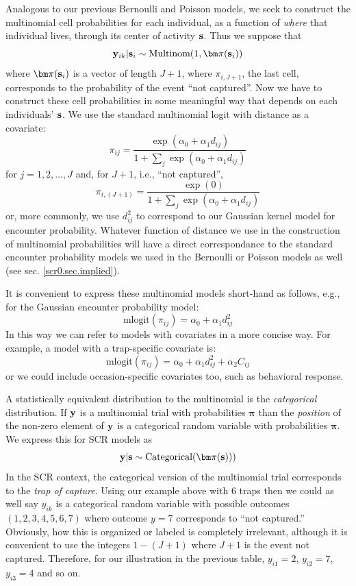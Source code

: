 Analogous to our previous Bernoulli and Poisson models, we seek to
construct the multinomial cell probabilities for each individual, as a
function of {\it where} that individual lives, through its center of
activity ${\bf s}$. Thus we suppose that
\begin{equation}
 {\bf y}_{ik}|{\bf s}_{i} \sim \mbox{Multinom}(1, {\bm \pi}({\bf s}_{i}) )
\label{poisson-mn.eq.mn}
\end{equation}
where ${\bm \pi}({\bf s}_{i})$ is a vector of length $J+1$, where
 $\pi_{i,J+1}$, the last cell, corresponds
 to the probability of the event ``not captured''.
Now we have to
construct these cell probabilities in some meaningful way that depends
on each individuals' ${\bf s}$.
We use the standard
multinomial logit with distance as a covariate:
\[
 \pi_{ij} = \frac{  \exp(\alpha_{0} + \alpha_{1} d_{ij}) }{ 1+ \sum_{j}
   \exp(\alpha_{0} + \alpha_{1} d_{ij})}
\]
for $j=1,2,\ldots,J$ and, for $J+1$, i.e., ``not captured'',
\[
 \pi_{i,(J+1)} = \frac{  \exp(0) }
                    { 1+ \sum_{j} \exp(\alpha_{0} + \alpha_{1} d_{ij})}
\]
or, more commonly, we use $d_{ij}^{2}$ to correspond to our Gaussian
kernel model for encounter probability. Whatever function of distance
we use in the construction of multinomial probabilities will have a
direct correspondance to the standard encounter probability models we
used in the Bernoulli or Poisson models as well (see
sec. \ref{scr0.sec.implied}). 

It is convenient to express these multinomial models short-hand as
follows, e.g., for the Gaussian encounter probability model:
\[
\mbox{mlogit}( \pi_{ij} ) = \alpha_{0} + \alpha_{1} d_{ij}^{2}
\]
In this way we can refer to models with covariates in a more concise
way. For example, a model with a trap-specific covariate is:
\[
\mbox{mlogit}( \pi_{ij} ) = \alpha_{0} + \alpha_{1} d_{ij}^{2} + \alpha_{2} C_{ij}
\]
or we could include occasion-specific covariates too, such as
behavioral response. 

A statistically equivalent distribution to the multinomial is the {\it categorical}
distribution.  If ${\bf y}$ is a multinomial trial with probabilities
${\bm \pi}$ than the {\it position} of the non-zero element of ${\bf
  y}$ is a categorical random variable with probabilities ${\bm \pi}$.
We express this for SCR models as
\[
{\bf y}|{\bf s} \sim \mbox{Categorical}( {\bm \pi}({\bf s})) )
\]
In the SCR context, the categorical version of the
multinomial trial corresponds to the {\it trap of capture}.  Using our
example above with 6 traps then we
could as well say $y_{ik}$ is a categorical random variable with
possible outcomes $(1,2,3,4,5,6,7)$ where outcome $y=7$
corresponds to ``not captured.'' Obviously, how this is organized or
labeled is completely irrelevant, although it is convenient to use the
integers $1 - (J+1)$ where $J+1$ is the event not captured.  Therefore,
for our illustration in the previous table, $y_{i1} = 2$, $y_{i2} =
7$, $y_{i3} = 4$ and so on.

